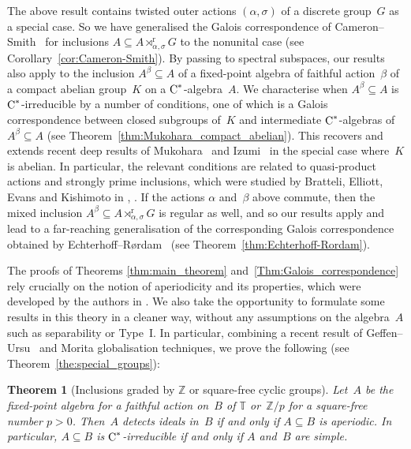 \documentclass[a4paper]{amsart}
\theoremstyle{plain}
\newtheorem{thmx}{Theorem}
\theoremstyle{definition}
\theoremstyle{remark}
\numberwithin{theorem}{section}
\numberwithin{equation}{section}
\newcommand*{\nb}{\nobreakdash}
\newcommand*{\Z}{\mathbb Z}
\newcommand*{\T}{\mathbb T}%
\newcommand*{\red}{\mathrm{r}}%
\newcommand*{\Cst}{\textup C^*}%
\begin{document}
The above result contains twisted outer actions \((\alpha,\sigma)\) of
a discrete group~\(G\) as a special case.
So we have generalised the Galois correspondence of
Cameron--Smith~\cite{Cameron-Smith:Galois_reduced} for inclusions
\(A\subseteq A\rtimes^\red_{\alpha,\sigma} G\) to the nonunital case
(see Corollary~\ref{cor:Cameron-Smith}).
By passing to spectral subspaces, our results also apply to the
inclusion \(A^\beta\subseteq A\) of a fixed-point algebra of faithful
action~\(\beta\) of a compact abelian group~\(K\) on a
\(\Cst\)\nb-algebra~\(A\).
We characterise when \(A^\beta\subseteq A\) is \(\Cst\)\nb-irreducible
by a number of conditions, one of which is a Galois correspondence
between closed subgroups of~\(K\) and intermediate
\(\Cst\)\nb-algebras of \(A^\beta\subseteq A\) (see
Theorem~\ref{thm:Mukohara_compact_abelian}).
This recovers and extends recent deep results of
Mukohara~\cite{Mukohara:Inclusions} and
Izumi~\cite{Izumi:Minimal_compact} in the special case where~\(K\) is
abelian.
In particular, the relevant conditions are related to quasi-product
actions and strongly prime inclusions, which were studied by Bratteli,
Elliott, Evans and Kishimoto in
\cite{Bratteli-Elliott-Evans-Kishimoto:Quasi-product},
\cite{Bratteli-Elliott-Kishimoto:Quasi-product}.
If the actions \(\alpha\) and~\(\beta\) above commute, then the
mixed inclusion \(A^\beta \subseteq A\rtimes^{\red}_{\alpha,\sigma}
G\) is regular as well, and so our results apply and lead to a
far-reaching generalisation of the corresponding Galois correspondence
obtained by Echterhoff--Rørdam~\cite{Echterhoff-Rordam:Inclusions}
(see Theorem~\ref{thm:Echterhoff-Rordam}).

The proofs of Theorems \ref{thm:main_theorem}
and~\ref{Thm:Galois_correspondence} rely crucially on the notion of
aperiodicity and its properties, which were developed by the authors
in \cites{Kwasniewski-Meyer:Aperiodicity, Kwasniewski-Meyer:Cartan,
  Kwasniewski-Meyer:Essential,
  Kwasniewski-Meyer:Aperiodicity_pseudo_expectations}.
We also take the opportunity to formulate some results in this theory
in a cleaner way, without any assumptions on the algebra~\(A\) such as
separability or Type~I.
In particular, combining a recent result of
Geffen--Ursu~\cite{Geffen-Ursu:Simple_crossed_products} and Morita
globalisation techniques, we prove the following (see
Theorem~\ref{the:special_groups}):

\begin{thmx}[Inclusions graded by \(\Z\) or square-free cyclic groups]
  \label{thmx:fixed_point_for special_compact}
  Let~\(A\) be the fixed-point algebra for a faithful action on~\(B\)
  of\/ \(\T\) or~\(\Z/p\) for a square-free number \(p>0\).
  Then~\(A\) detects ideals in~\(B\) if and only if \(A\subseteq B\)
  is aperiodic.
  In particular, \(A\subseteq B\) is \(\Cst\)\nb-irreducible if and
  only if \(A\) and~\(B\) are simple.
\end{thmx}
\end{document}
